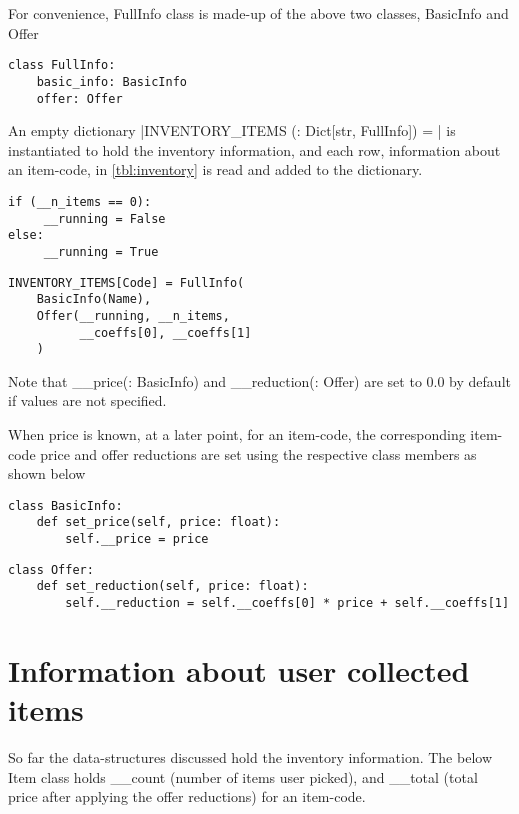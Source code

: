 \documentclass[11pt,a4paper,oneside,onecolumn]{article}
\begin{document}
For convenience, FullInfo class is made-up of the above two classes, BasicInfo and Offer

\begin{verbatim}
class FullInfo:
    basic_info: BasicInfo
    offer: Offer
\end{verbatim}

 An empty dictionary
  |INVENTORY_ITEMS (: Dict[str, FullInfo]) = {}|
 is instantiated to hold the inventory information, and each row,
 information about an item-code, in \cref{tbl:inventory} is read and added to the dictionary.

 \begin{multicols}{2}
 \begin{verbatim}
if (__n_items == 0):
     __running = False
else:
     __running = True
     \end{verbatim}


\vfill

\begin{verbatim}
INVENTORY_ITEMS[Code] = FullInfo(
    BasicInfo(Name),
    Offer(__running, __n_items,
          __coeffs[0], __coeffs[1]
    )

 \end{verbatim}
 \end{multicols}

Note that \_\_price(: BasicInfo) and \_\_reduction(: Offer) are set to $0.0$ by default
if values are not specified.

When price is known, at a later point, for an item-code, the corresponding item-code price
and offer reductions are set using the respective class members as shown below

\begin{verbatim}
class BasicInfo:
    def set_price(self, price: float):
        self.__price = price
\end{verbatim}

\begin{verbatim}
class Offer:
    def set_reduction(self, price: float):
        self.__reduction = self.__coeffs[0] * price + self.__coeffs[1]
\end{verbatim}

\section{Information about user collected items}

So far the data-structures discussed hold the inventory information.
The below Item class holds \_\_count (number of items user picked),
and \_\_total (total price after applying the offer reductions)
for an item-code.
\end{document}
